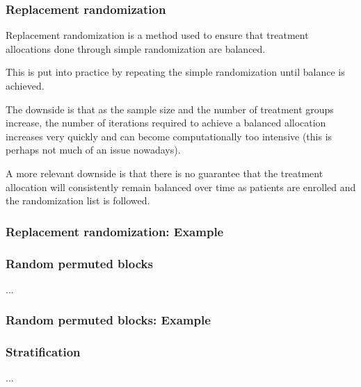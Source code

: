 \documentclass{beamer}
\begin{document}
\begin{frame}
    \frametitle{Replacement randomization}
	Replacement randomization is a method used to ensure that treatment allocations
	done through simple randomization are balanced.
	
	\bigskip
	
	This is put into practice by repeating the simple randomization until balance is achieved.
	
	\bigskip
	
	The downside is that as the sample size and the number of treatment groups increase, the number
	of iterations required to achieve a balanced allocation increases very quickly and can
	become computationally too intensive (this is perhaps not much of an issue nowadays).
	
	\bigskip
	
	A more relevant downside is that there is no guarantee that the treatment allocation will
	consistently remain balanced over time as patients are enrolled and the randomization
	list is followed.
\end{frame}


\begin{frame}[fragile]
    \frametitle{Replacement randomization: Example}
	
\end{frame}


\begin{frame}
    \frametitle{Random permuted blocks}
	...
\end{frame}


\begin{frame}[fragile]
    \frametitle{Random permuted blocks: Example}
	
\end{frame}


\begin{frame}
    \frametitle{Stratification}
	...
\end{frame}


\end{document}
